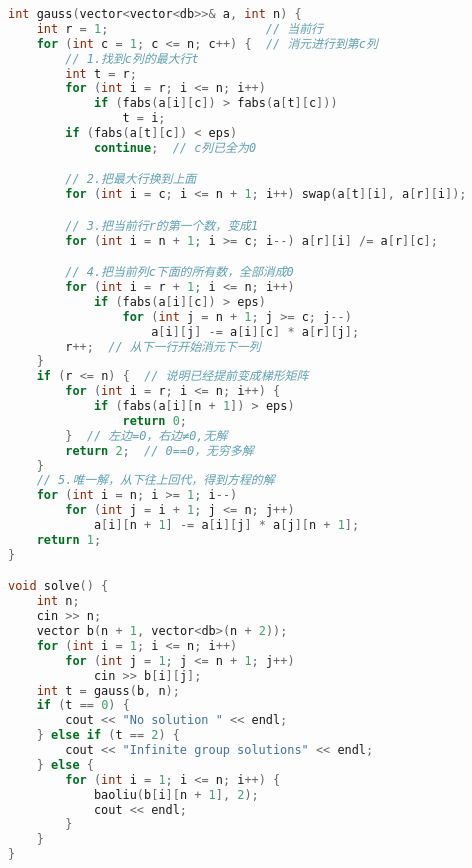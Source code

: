 \begin{lstlisting}[language=C++]
int gauss(vector<vector<db>>& a, int n) {
    int r = 1;                      // 当前行
    for (int c = 1; c <= n; c++) {  // 消元进行到第c列
        // 1.找到c列的最大行t
        int t = r;
        for (int i = r; i <= n; i++)
            if (fabs(a[i][c]) > fabs(a[t][c]))
                t = i;
        if (fabs(a[t][c]) < eps)
            continue;  // c列已全为0

        // 2.把最大行换到上面
        for (int i = c; i <= n + 1; i++) swap(a[t][i], a[r][i]);

        // 3.把当前行r的第一个数，变成1
        for (int i = n + 1; i >= c; i--) a[r][i] /= a[r][c];

        // 4.把当前列c下面的所有数，全部消成0
        for (int i = r + 1; i <= n; i++)
            if (fabs(a[i][c]) > eps)
                for (int j = n + 1; j >= c; j--)
                    a[i][j] -= a[i][c] * a[r][j];
        r++;  // 从下一行开始消元下一列
    }
    if (r <= n) {  // 说明已经提前变成梯形矩阵
        for (int i = r; i <= n; i++) {
            if (fabs(a[i][n + 1]) > eps)
                return 0;
        }  // 左边=0，右边≠0,无解
        return 2;  // 0==0，无穷多解
    }
    // 5.唯一解，从下往上回代，得到方程的解
    for (int i = n; i >= 1; i--)
        for (int j = i + 1; j <= n; j++)
            a[i][n + 1] -= a[i][j] * a[j][n + 1];
    return 1;
}

void solve() {
    int n;
    cin >> n;
    vector b(n + 1, vector<db>(n + 2));
    for (int i = 1; i <= n; i++)
        for (int j = 1; j <= n + 1; j++)
            cin >> b[i][j];
    int t = gauss(b, n);
    if (t == 0) {
        cout << "No solution " << endl;
    } else if (t == 2) {
        cout << "Infinite group solutions" << endl;
    } else {
        for (int i = 1; i <= n; i++) {
            baoliu(b[i][n + 1], 2);
            cout << endl;
        }
    }
}
\end{lstlisting}
